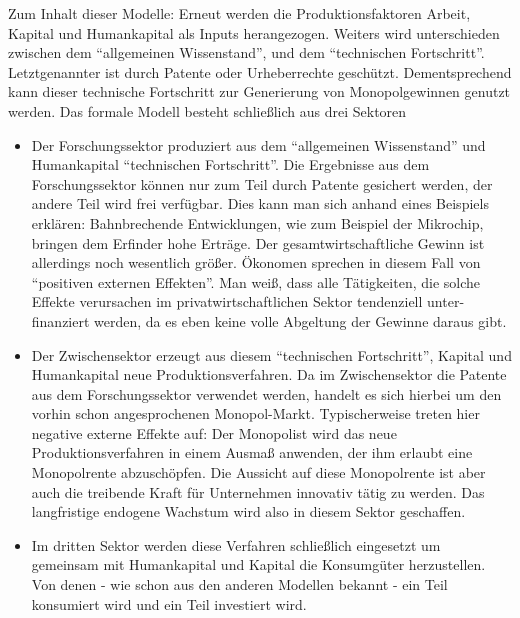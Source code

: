 Zum Inhalt dieser Modelle: Erneut werden die Produktionsfaktoren Arbeit, Kapital und Humankapital als Inputs herangezogen. Weiters wird unterschieden zwischen dem "`allgemeinen Wissenstand"', und dem "`technischen Fortschritt"'. Letztgenannter ist durch Patente oder Urheberrechte geschützt. Dementsprechend kann dieser technische Fortschritt zur Generierung von Monopolgewinnen genutzt werden. Das formale Modell besteht schließlich aus drei Sektoren \parencite[S. 79]{Romer1990}
\begin{itemize}
	\item Der Forschungssektor produziert aus dem "`allgemeinen Wissenstand"' und Humankapital "`technischen Fortschritt"'. Die Ergebnisse aus dem Forschungssektor können nur zum Teil durch Patente gesichert werden, der andere Teil wird frei verfügbar. Dies kann man sich anhand eines Beispiels erklären: Bahnbrechende Entwicklungen, wie zum Beispiel der Mikrochip, bringen dem Erfinder hohe Erträge. Der gesamtwirtschaftliche Gewinn ist allerdings noch wesentlich größer. Ökonomen sprechen in diesem Fall von "`positiven externen Effekten"'. Man weiß, dass alle Tätigkeiten, die solche Effekte verursachen im privatwirtschaftlichen Sektor tendenziell unter-finanziert werden, da es eben keine volle Abgeltung der Gewinne daraus gibt.
	\item Der Zwischensektor erzeugt aus diesem "`technischen Fortschritt"', Kapital und Humankapital neue Produktionsverfahren. Da im Zwischensektor die Patente aus dem Forschungssektor verwendet werden, handelt es sich hierbei um den vorhin schon angesprochenen Monopol-Markt. Typischerweise treten hier negative externe Effekte auf: Der Monopolist wird das neue Produktionsverfahren in einem Ausmaß anwenden, der ihm erlaubt eine Monopolrente abzuschöpfen. Die Aussicht auf diese Monopolrente ist aber auch die treibende Kraft für Unternehmen innovativ tätig zu werden. Das langfristige endogene Wachstum wird also in diesem Sektor geschaffen.	
	\item Im dritten Sektor werden diese Verfahren schließlich eingesetzt um gemeinsam mit Humankapital und Kapital die Konsumgüter herzustellen. Von denen - wie schon aus den anderen Modellen bekannt - ein Teil konsumiert wird und ein Teil investiert wird.
\end{itemize} 
